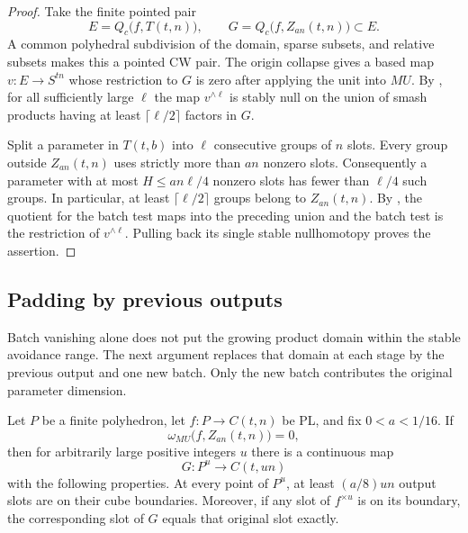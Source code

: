 \begin{proof}
Take the finite pointed pair
\[
 E=Q_c\bigl(f,T(t,n)\bigr),\qquad
 G=Q_c\bigl(f,Z_{an}(t,n)\bigr)\subset E.
\]
A common polyhedral subdivision of the domain, sparse subsets, and
relative subsets makes this a pointed CW pair.  The origin collapse
gives a based map $v:E\to S^{tn}$ whose restriction to $G$ is zero
after applying the unit into $MU$.  By , for
all sufficiently large $\ell$ the map $v^{\wedge\ell}$ is stably null
on the union of smash products having at least
$\lceil\ell/2\rceil$ factors in $G$.

Split a parameter in $T(t,b)$ into $\ell$ consecutive groups of $n$
slots.  Every group outside $Z_{an}(t,n)$ uses strictly more than $an$
nonzero slots.  Consequently a parameter with at most
$H\le an\ell/4$ nonzero slots has fewer than $\ell/4$ such groups.
In particular, at least $\lceil\ell/2\rceil$ groups belong to
$Z_{an}(t,n)$.  By , the quotient for
the batch test maps into the preceding union and the batch test is
the restriction of $v^{\wedge\ell}$.  Pulling back its single stable
nullhomotopy proves the assertion.
\end{proof}

\subsection{Padding by previous outputs}

Batch vanishing alone does not put the growing product domain within
the stable avoidance range.  The next argument replaces that domain
at each stage by the previous output and one new batch.  Only the
new batch contributes the original parameter dimension.

\begin{theorem}
\label{thm:boundary-compression}
Let $P$ be a finite polyhedron, let $f:P\to C(t,n)$ be PL, and fix
$0<a<1/16$.  If
\[
 \omega_{MU}\bigl(f,Z_{an}(t,n)\bigr)=0,
\]
then for arbitrarily large positive integers $u$ there is a continuous
map
\[
 G:P^u\longrightarrow C(t,un)
\]
with the following properties.  At every point of $P^u$, at least
$(a/8)un$ output slots are on their cube boundaries.  Moreover, if any
slot of $f^{\times u}$ is on its boundary, the corresponding slot of
$G$ equals that original slot exactly.
\end{theorem}

